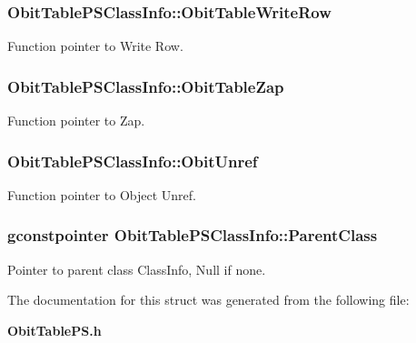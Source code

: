 \subsubsection{ {\bf Obit\-Table\-PSClass\-Info::Obit\-Table\-Write\-Row}}\label{structObitTablePSClassInfo_o26}


Function pointer to Write Row. 

\subsubsection{ {\bf Obit\-Table\-PSClass\-Info::Obit\-Table\-Zap}}\label{structObitTablePSClassInfo_o19}


Function pointer to Zap. 

\subsubsection{ {\bf Obit\-Table\-PSClass\-Info::Obit\-Unref}}\label{structObitTablePSClassInfo_o11}


Function pointer to Object Unref. 

\subsubsection{\setlength{\rightskip}{0pt plus 5cm}gconstpointer {\bf Obit\-Table\-PSClass\-Info::Parent\-Class}}\label{structObitTablePSClassInfo_o3}


Pointer to parent class Class\-Info, Null if none. 



The documentation for this struct was generated from the following file:\begin{CompactItemize}
\item 
{\bf Obit\-Table\-PS.h}\end{CompactItemize}

